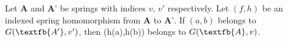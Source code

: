 %

\begin{proposition}
  Let $\textbf{A}$ and $\textbf{A'}$ be springs with indices $v$, $v'$
  respectively. Let $(f,h)$ be an indexed spring homomorphism from $\textbf{A}$
  to $\textbf{A'}$. If $(a,b)$ belongs to $G(\textfb{A'},v')$, then (h(a),h(b))
  belongs to $G(\textfb{A},v)$.
\end{proposition}
